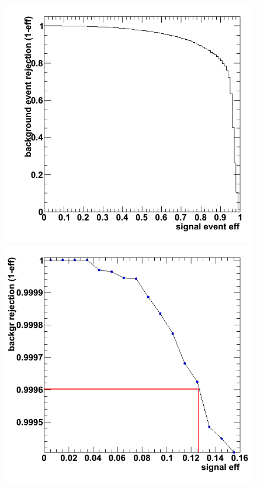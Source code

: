 \begin{figure}[h]
  \begin{center}
    \begin{minipage}{.3\textwidth}
      \includegraphics[width=\textwidth]{images/mkRocEventSvm}
    \end{minipage}
    \hspace{.02\textwidth}
    \begin{minipage}{.3\textwidth}
      \includegraphics[width=\textwidth]{images/mkRocEventSvm_zoom}

\end{minipage}
\end{center}
\end{figure}
